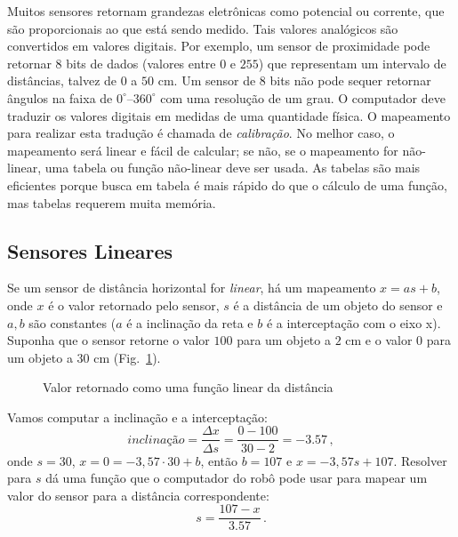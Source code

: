 Muitos sensores retornam grandezas eletrônicas como potencial ou corrente, que são proporcionais ao que está sendo medido. Tais valores analógicos são convertidos em valores digitais. Por exemplo, um sensor de proximidade pode retornar $8$ bits de dados (valores entre $0$ e $255$) que representam um intervalo de distâncias, talvez de $0$ a $50$ cm. Um sensor de $8$ bits não pode sequer retornar ângulos na faixa de $0^{\circ}$--$360^{\circ}$ com uma resolução de um grau. O computador deve traduzir os valores digitais em medidas de uma quantidade física. O mapeamento para realizar esta tradução é chamada de \emph{calibração}. No melhor caso, o mapeamento será linear e fácil de calcular; se não, se o mapeamento for não-linear, uma tabela ou função não-linear deve ser usada. As tabelas são mais eficientes porque busca em tabela é mais rápido do que o cálculo de uma função, mas tabelas requerem muita memória.

\subsection{Sensores Lineares}

Se um sensor de distância horizontal for \emph{linear}, há um mapeamento $x = a s + b$, onde $x$ é o valor retornado pelo sensor, $s$ é a distância de um objeto do sensor e $a,b$ são constantes ($a$ é a inclinação da reta e $b$ é a interceptação com o eixo x). Suponha que o sensor retorne o valor $100$ para um objeto a $2$ cm e o valor $0$ para um objeto a $30$ cm (Fig.~\ref{fig.linear}).

\begin{figure}
\begin{center}
\caption{Valor retornado como uma função linear da distância}\label{fig.linear}
\end{center}
\end{figure}

Vamos computar a inclinação e a interceptação:
\[
\textit{inclinação} = \frac{\Delta x}{\Delta s} = \frac{0-100}{30-2}=-3.57\,,
\]
onde $s=30$, $x=0=-3,57\cdot 30+b$, então $b=107$ e $x = -3,57 s + 107$. Resolver para $s$ dá uma função que o computador do robô pode usar para mapear um valor do sensor para a distância correspondente:
\[
s = \frac{107-x}{3.57}\,.
\]

